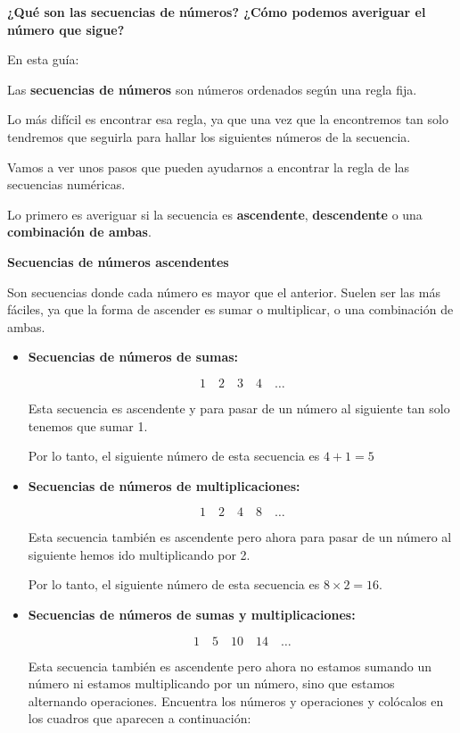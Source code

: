 \documentclass[12pt,a4paper]{article}
\begin{document}
\begin{tcolorbox}[colback=fondorosa,colframe=rojoclaro,title=MINI-EXPLICACIONES: SECUENCIAS DE NÚMEROS,breakable]

\textbf{¿Qué son las secuencias de números? ¿Cómo podemos averiguar el número que sigue?}

En esta guía:

Las \textbf{secuencias de números} son números ordenados según una regla fija.

Lo más difícil es encontrar esa regla, ya que una vez que la encontremos tan solo tendremos que seguirla para hallar los siguientes números de la secuencia.

Vamos a ver unos pasos que pueden ayudarnos a encontrar la regla de las secuencias numéricas.

Lo primero es averiguar si la secuencia es \textbf{ascendente}, \textbf{descendente} o una \textbf{combinación de ambas}.

\textbf{Secuencias de números ascendentes}

Son secuencias donde cada número es mayor que el anterior. Suelen ser las más fáciles, ya que la forma de ascender es sumar o multiplicar, o una combinación de ambas.

\begin{itemize}
    \item \textbf{Secuencias de números de sumas:}

    \[ 1 \quad 2 \quad 3 \quad 4 \quad \ldots \]

    Esta secuencia es ascendente y para pasar de un número al siguiente tan solo tenemos que sumar 1.

    Por lo tanto, el siguiente número de esta secuencia es $4 + 1 = 5$

    \item \textbf{Secuencias de números de multiplicaciones:}

    \[ 1 \quad 2 \quad 4 \quad 8 \quad \ldots \]

    Esta secuencia también es ascendente pero ahora para pasar de un número al siguiente hemos ido multiplicando por 2.

    Por lo tanto, el siguiente número de esta secuencia es $8 \times 2 = 16$.

    \item \textbf{Secuencias de números de sumas y multiplicaciones:}

    \[ 1 \quad 5 \quad 10 \quad 14 \quad \ldots \]

    Esta secuencia también es ascendente pero ahora no estamos sumando un número ni estamos multiplicando por un número, sino que estamos alternando operaciones. Encuentra los números y operaciones y colócalos en los cuadros que aparecen a continuación:


\end{itemize}
\end{tcolorbox}
\end{document}
